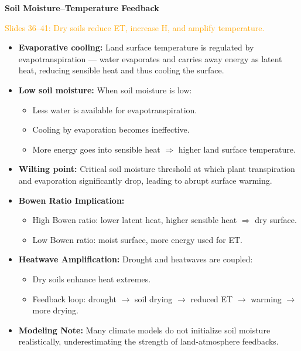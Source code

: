 \documentclass[fontsize=8pt, a4paper, landscape, fleqn]{scrartcl}
\renewcommand{\subsection}[1]{%
    \noindent\colorbox{subsectioncolor}{%
        \parbox{\dimexpr\columnwidth-2\fboxsep}{\color{white}\textbf{#1}}}%
    \vspace{0.5mm}%
}
\begin{document}
\begin{multicols*}{3}[\raggedcolumns]
\subsection{Soil Moisture–Temperature Feedback}
\noindent \textcolor{orange}{Slides 36–41: Dry soils reduce ET, increase H, and amplify temperature.}

\begin{itemize}
    \item \textbf{Evaporative cooling:} Land surface temperature is regulated by evapotranspiration — water evaporates and carries away energy as latent heat, reducing sensible heat and thus cooling the surface.
    
    \item \textbf{Low soil moisture:} When soil moisture is low:
    \begin{itemize}
        \item Less water is available for evapotranspiration.
        \item Cooling by evaporation becomes ineffective.
        \item More energy goes into sensible heat $\Rightarrow$ higher land surface temperature.
    \end{itemize}

    \item \textbf{Wilting point:} Critical soil moisture threshold at which plant transpiration and evaporation significantly drop, leading to abrupt surface warming.

    \item \textbf{Bowen Ratio Implication:}
    \begin{itemize}
        \item High Bowen ratio: lower latent heat, higher sensible heat $\Rightarrow$ dry surface.
        \item Low Bowen ratio: moist surface, more energy used for ET.
    \end{itemize}
    
    \item \textbf{Heatwave Amplification:} Drought and heatwaves are coupled:
    \begin{itemize}
        \item Dry soils enhance heat extremes.
        \item Feedback loop: drought $\rightarrow$ soil drying $\rightarrow$ reduced ET $\rightarrow$ warming $\rightarrow$ more drying.
    \end{itemize}

    \item \textbf{Modeling Note:} Many climate models do not initialize soil moisture realistically, underestimating the strength of land-atmosphere feedbacks.


\end{itemize}
\end{multicols*}
\end{document}
